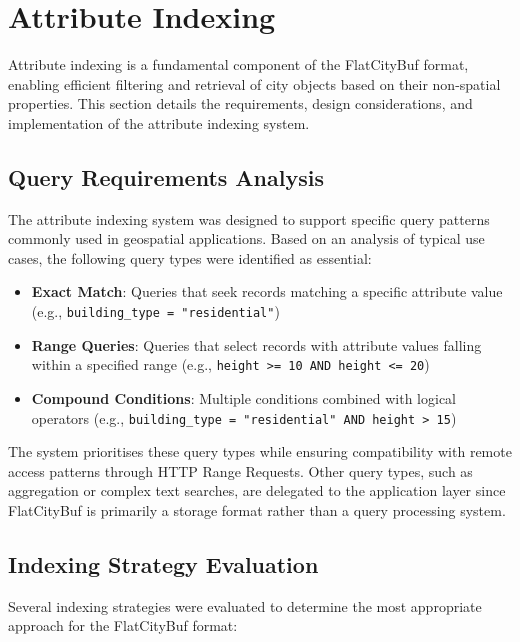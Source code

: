 \section{Attribute Indexing}
\label{sec:attribute_indexing}

Attribute indexing is a fundamental component of the FlatCityBuf format, enabling efficient filtering and retrieval of city objects based on their non-spatial properties. This section details the requirements, design considerations, and implementation of the attribute indexing system.

\subsection{Query Requirements Analysis}
\label{subsec:query_requirements}

The attribute indexing system was designed to support specific query patterns commonly used in geospatial applications. Based on an analysis of typical use cases, the following query types were identified as essential:

\begin{itemize}
    \item \textbf{Exact Match}: Queries that seek records matching a specific attribute value (e.g., \texttt{building\_type = "residential"})
    \item \textbf{Range Queries}: Queries that select records with attribute values falling within a specified range (e.g., \texttt{height >= 10 AND height <= 20})
    \item \textbf{Compound Conditions}: Multiple conditions combined with logical operators (e.g., \texttt{building\_type = "residential" AND height > 15})
\end{itemize}

The system prioritises these query types while ensuring compatibility with remote access patterns through HTTP Range Requests. Other query types, such as aggregation or complex text searches, are delegated to the application layer since FlatCityBuf is primarily a storage format rather than a query processing system.

\subsection{Indexing Strategy Evaluation}
\label{subsec:indexing_strategy_evaluation}

Several indexing strategies were evaluated to determine the most appropriate approach for the FlatCityBuf format:

